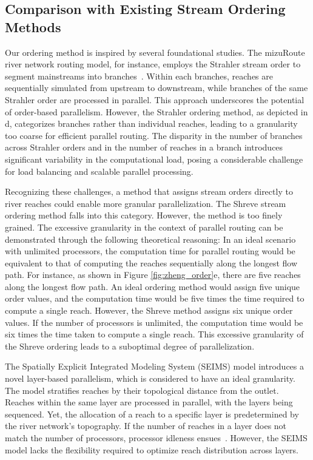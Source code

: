 \documentclass[water,article,submit,pdftex,moreauthors]{Definitions/mdpi}
\begin{document}
\subsection{Comparison with Existing Stream Ordering Methods}
\label{sec:comparison}

Our ordering method is inspired by several foundational studies. The mizuRoute river network routing model, for instance, employs the Strahler stream order to segment mainstreams into branches~\cite{mizukami2021JAMES}. Within each branches, reaches are sequentially simulated from upstream to downstream, while branches of the same Strahler order are processed in parallel. This approach underscores the potential of order-based parallelism. However, the Strahler ordering method, as depicted in d, categorizes branches rather than individual reaches, leading to a granularity too coarse for efficient parallel routing. The disparity in the number of branches across Strahler orders and in the number of reaches in a branch introduces significant variability in the computational load, posing a considerable challenge for load balancing and scalable parallel processing.

Recognizing these challenges, a method that assigns stream orders directly to river reaches could enable more granular parallelization. The Shreve stream ordering method falls into this category. However, the method is too finely grained. The excessive granularity in the context of parallel routing can be demonstrated through the following theoretical reasoning: In an ideal scenario with unlimited processors, the computation time for parallel routing would be equivalent to that of computing the reaches sequentially along the longest flow path. For instance, as shown in Figure \ref{fig:zheng_order}e, there are five reaches along the longest flow path. An ideal ordering method would assign five unique order values, and the computation time would be five times the time required to compute a single reach. However, the Shreve method assigns six unique order values. If the number of processors is unlimited, the computation time would be six times the time taken to compute a single reach. This excessive granularity of the Shreve ordering leads to a suboptimal degree of parallelization.

The Spatially Explicit Integrated Modeling System (SEIMS) model introduces a novel layer-based parallelism\cite{liu2014EMS, liu2016EMS, zhu2019EMS}, which is considered to have an ideal granularity. The model stratifies reaches by their topological distance from the outlet. Reaches within the same layer are processed in parallel, with the layers being sequenced. Yet, the allocation of a reach to a specific layer is predetermined by the river network's topography. If the number of reaches in a layer does not match the number of processors, processor idleness ensues~\cite{liu2014EMS, zhu2019EMS}. However, the SEIMS model lacks the flexibility required to optimize reach distribution across layers.
\end{document}
